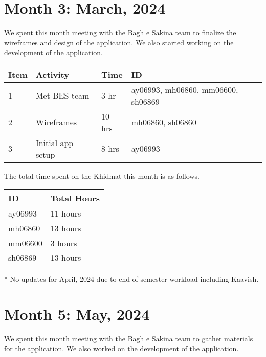 \documentclass{article}
\begin{document}
\newpage %
\section*{Month 3: March, 2024}

We spent this month meeting with the Bagh e Sakina team to finalize the
wireframes and design of the application. We also started working on the
development of the application.

\begin{tabular}{|l|l|l|l|}
  \hline
  Item & Activity          & Time   & ID                                 \\\hline\hline
  1    & Met BES team      & 3 hr   & ay06993, mh06860, mm06600, sh06869 \\\hline
  2    & Wireframes        & 10 hrs & mh06860, sh06860                   \\\hline
  3    & Initial app setup & 8 hrs  & ay06993                            \\\hline
\end{tabular}

The total time spent on the Khidmat this month is as follows.

\begin{tabular}{|l|l|}
  \hline
  ID      & Total Hours \\\hline\hline
  ay06993 & 11 hours    \\\hline
  mh06860 & 13 hours    \\\hline
  mm06600 & 3 hours     \\\hline
  sh06869 & 13 hours    \\\hline
\end{tabular}

\newpage %
* No updates for April, 2024 due to end of semester workload including Kaavish.
\section*{Month 5: May, 2024}

We spent this month meeting with the Bagh e Sakina team to gather materials for
the application. We also worked on the development of the application.
\end{document}
